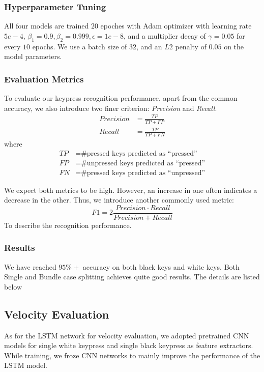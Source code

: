 \documentclass[10pt,twocolumn,letterpaper]{article}
\begin{document}
\subsubsection{Hyperparameter Tuning}

All four models are trained \(20\) epoches with Adam optimizer with learning rate \(5e-4\), \(\beta_1 = 0.9, \beta_2 = 0.999, \epsilon = 1e-8\), and a multiplier decay of \(\gamma=0.05\) for every $10$ epochs. 
We use a batch size of \(32\), and an \(L2\) penalty of \(0.05\) on the model parameters. 

\subsubsection{Evaluation Metrics}

To evaluate our keypress recognition performance, apart from the common accuracy, we also introduce two finer criterion: \textit{Precision} and \textit{Recall}.
\begin{align*}
   Precision &= \frac{TP}{TP+FP}\\
   Recall &= \frac{TP}{TP+FN}
\end{align*}
where
\begin{align*}
   TP &= \text{\# pressed keys predicted as ``pressed''}\\
   FP &= \text{\# unpressed keys predicted as ``pressed''}\\
   FN &= \text{\# pressed keys predicted as ``unpressed''}
\end{align*}

We expect both metrics to be high. However, an increase in one often indicates a decrease in the other.
Thus, we introduce another commonly used metric:
$$F1 = 2\dfrac{Precision\cdot Recall}{Precision + Recall}$$
To describe the recognition performance.

\subsubsection{Results}

We have reached \(95\%+\) accuracy on both black keys and white keys. 
Both Single and Bundle case splitting achieves quite good results.
The details are listed below

\subsection{Velocity Evaluation}

As for the LSTM network for velocity evaluation, we adopted pretrained CNN models for single white keypress and single black keypress as feature extractors. While training, we froze CNN networks to mainly improve the performance of the LSTM model.
\end{document}
